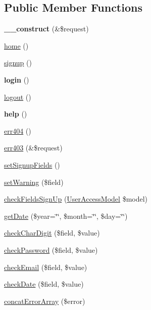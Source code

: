 \subsection*{Public Member Functions}
\begin{DoxyCompactItemize}
\item 
\hypertarget{classBasePageController_a483998015a3518d49897d271de2e3c2d}{{\bfseries \+\_\+\+\_\+construct} (\&\$request)}\label{classBasePageController_a483998015a3518d49897d271de2e3c2d}

\item 
\hyperlink{classBasePageController_addd9e4039a708810ae0e60b94649db57}{home} ()
\item 
\hyperlink{classBasePageController_aed3342fa72b2849f027fec00f1f88548}{signup} ()
\item 
\hypertarget{classBasePageController_ab8b972729d58ef6681fbe74bb22ffb6a}{{\bfseries login} ()}\label{classBasePageController_ab8b972729d58ef6681fbe74bb22ffb6a}

\item 
\hyperlink{classBasePageController_ad065341a301057b6b0dfc3b1e56ed56a}{logout} ()
\item 
\hypertarget{classBasePageController_a7d24305ce4d1a6062e9d363460902ae3}{{\bfseries help} ()}\label{classBasePageController_a7d24305ce4d1a6062e9d363460902ae3}

\item 
\hyperlink{classBasePageController_a34b8830d87502cefa09b06450f2b1fa7}{err404} ()
\item 
\hyperlink{classBasePageController_a984b448e25573a6de434b03e9f0c2795}{err403} (\&\$request)
\item 
\hyperlink{classBasePageController_a877c4f32b7d39e566f7832aef94c2f11}{set\+Signup\+Fields} ()
\item 
\hyperlink{classBasePageController_a777f34065716ce7f7706ea745fbdd254}{set\+Warning} (\$field)
\item 
\hyperlink{classBasePageController_a56e85dfb915144831cf39435b88774f5}{check\+Fields\+Sign\+Up} (\hyperlink{classUserAccessModel}{User\+Access\+Model} \$model)
\item 
\hyperlink{classBasePageController_a2aaad6f0fa836c9d7e6d9df5974cb4a7}{get\+Date} (\$year=\char`\"{}\char`\"{}, \$month=\char`\"{}\char`\"{}, \$day=\char`\"{}\char`\"{})
\item 
\hyperlink{classBasePageController_a34d606ee039e2042cf6727ac16dabb70}{check\+Char\+Digit} (\$field, \$value)
\item 
\hyperlink{classBasePageController_a6829b94ed721619b43879475c75b8fc8}{check\+Password} (\$field, \$value)
\item 
\hyperlink{classBasePageController_a5a0788181caf223a4ce208702c93e0c8}{check\+Email} (\$field, \$value)
\item 
\hyperlink{classBasePageController_a6f1a0a900ee8f95b6b6f12c52272a9a7}{check\+Date} (\$field, \$value)
\item 
\hyperlink{classBasePageController_ac0083ad81bbac88f3ca4bdf258566a07}{concat\+Error\+Array} (\$error)
\end{DoxyCompactItemize}
